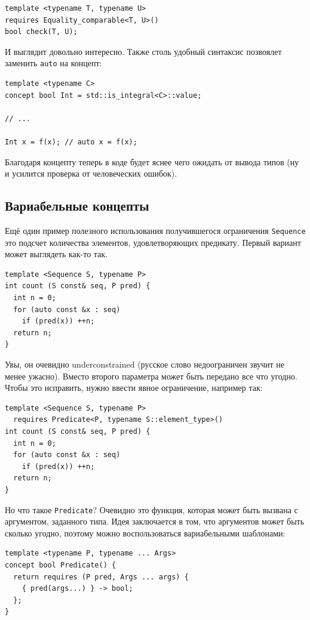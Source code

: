 \documentclass[a4paper,12pt,oneside]{book}
\begin{document}
\begin{lstlisting}
template <typename T, typename U>
requires Equality_comparable<T, U>()
bool check(T, U);
\end{lstlisting}

И выглядит довольно интересно. Также столь удобный синтаксис позвоялет заменить \lstinline!auto! на концепт:

\begin{lstlisting}
template <typename C> 
concept bool Int = std::is_integral<C>::value;

// ...

Int x = f(x); // auto x = f(x);
\end{lstlisting}

Благодаря концепту теперь в коде будет яснее чего ожидать от вывода типов (ну и усилится проверка от человеческих ошибок).

\subsection{Вариабельные концепты}

Ещё один пример полезного использования получившегося ограничения \lstinline!Sequence! это подсчет количества элементов, удовлетворяющих предикату. Первый вариант может выглядеть как-то так.

\begin{lstlisting}
template <Sequence S, typename P>
int count (S const& seq, P pred) {
  int n = 0;
  for (auto const &x : seq)
    if (pred(x)) ++n;
  return n;
}
\end{lstlisting}

Увы, он очевидно underconstrained (русское слово недоограничен звучит не менее ужасно). Вместо второго параметра может быть передано все что угодно. Чтобы это исправить, нужно ввести явное ограничение, например так:

\begin{lstlisting}
template <Sequence S, typename P>
  requires Predicate<P, typename S::element_type>()
int count (S const& seq, P pred) {
  int n = 0;
  for (auto const &x : seq)
    if (pred(x)) ++n;
  return n;
}
\end{lstlisting}

Но что такое \lstinline!Predicate!? Очевидно это функция, которая может быть вызвана с аргументом, заданного типа. Идея заключается в том, что аргументов может быть сколько угодно, поэтому можно воспользоваться вариабельными шаблонами:

\begin{lstlisting}
template <typename P, typename ... Args>
concept bool Predicate() {
  return requires (P pred, Args ... args) {
    { pred(args...) } -> bool;
  };
}
\end{lstlisting}
\end{document}
